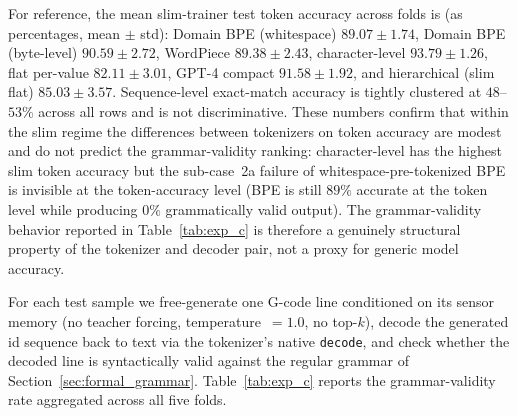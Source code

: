 \documentclass[11pt]{article}
\begin{document}
For reference, the mean slim-trainer test token accuracy across folds is (as percentages, mean $\pm$ std): Domain BPE (whitespace) $89.07 \pm 1.74$, Domain BPE (byte-level) $90.59 \pm 2.72$, WordPiece $89.38 \pm 2.43$, character-level $93.79 \pm 1.26$, flat per-value $82.11 \pm 3.01$, GPT-4 compact $91.58 \pm 1.92$, and hierarchical (slim flat) $85.03 \pm 3.57$. Sequence-level exact-match accuracy is tightly clustered at $48$--$53\%$ across all rows and is not discriminative. These numbers confirm that within the slim regime the differences between tokenizers on token accuracy are modest and do not predict the grammar-validity ranking: character-level has the highest slim token accuracy but the sub-case~2a failure of whitespace-pre-tokenized BPE is invisible at the token-accuracy level (BPE is still $89\%$ accurate at the token level while producing $0\%$ grammatically valid output). The grammar-validity behavior reported in Table~\ref{tab:exp_c} is therefore a genuinely structural property of the tokenizer and decoder pair, not a proxy for generic model accuracy.

For each test sample we free-generate one G-code line conditioned on its sensor memory (no teacher forcing, temperature~$=1.0$, no top-$k$), decode the generated id sequence back to text via the tokenizer's native \texttt{decode}, and check whether the decoded line is syntactically valid against the regular grammar of Section~\ref{sec:formal_grammar}. Table~\ref{tab:exp_c} reports the grammar-validity rate aggregated across all five folds.
\end{document}
